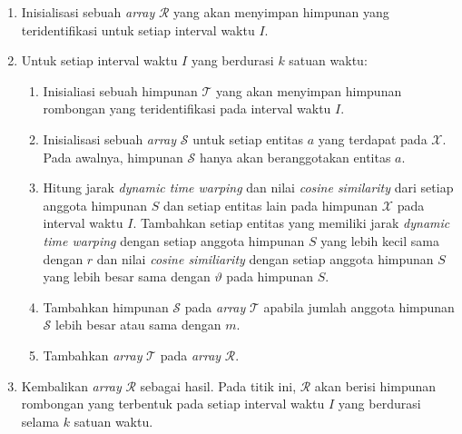 \begin{enumerate}
    \item Inisialisasi sebuah \textit{array} $\mathcal{R}$ yang akan menyimpan himpunan \pergerakankolektif yang teridentifikasi untuk setiap interval waktu $I$.
    \item Untuk setiap interval waktu $I$ yang berdurasi $k$ satuan waktu:
    
    \begin{enumerate}
        \item Inisialiasi sebuah himpunan $\mathcal{T}$ yang akan menyimpan himpunan rombongan yang teridentifikasi pada interval waktu $I$.  
        \item Inisialisasi sebuah \textit{array} $\mathcal{S}$ untuk setiap entitas $a$ yang terdapat pada $\mathcal{X}$. Pada awalnya, himpunan $\mathcal{S}$ hanya akan beranggotakan entitas $a$.
        \item Hitung jarak \textit{dynamic time warping} dan nilai \textit{cosine similarity} dari setiap anggota himpunan $S$ dan setiap entitas lain pada himpunan $\mathcal{X}$ pada interval waktu $I$. Tambahkan setiap entitas yang memiliki jarak \textit{dynamic time warping} dengan setiap anggota himpunan $S$ yang lebih kecil sama dengan $r$ dan nilai \textit{cosine similiarity} dengan setiap anggota himpunan $S$ yang lebih besar sama dengan $\vartheta$ pada himpunan $S$.
        \item Tambahkan himpunan $\mathcal{S}$ pada \textit{array} $\mathcal{T}$ apabila jumlah anggota himpunan $\mathcal{S}$ lebih besar atau sama dengan $m$.
        \item Tambahkan \textit{array} $\mathcal{T}$ pada \textit{array} $\mathcal{R}$.
    \end{enumerate}
    \item Kembalikan \textit{array} $\mathcal{R}$ sebagai hasil. Pada titik ini, $\mathcal{R}$ akan berisi himpunan rombongan yang terbentuk pada setiap interval waktu $I$ yang berdurasi selama $k$ satuan waktu.
\end{enumerate}

\iffalse

Algoritma tersebut memiliki kompleksitas waktu sebesar $O(n^4k^2)$ di mana $n$ merupakan jumlah entitas yang terdapat pada $\mathcal{X}$. Hal tersebut dapat dilihat pada baris 12 dari algoritma identifikasi. Pada titik tersebut, algoritma identifikasi memiliki kompleksitas sebesar $O(n^4)$ dan fungsi $DTWDistance$ memiliki kompleksitas sebesar $O(t^2)$ seperti yang sudah dibahas melalui subbab \ref{sec:dtw}. Sedangkan kompleksitas tempat yang dimiliki oleh algoritma tersebut adalah sebesar $O(n\;i)$ di mana $i$ merupakan jum. Hal tersebut dapat dihitung melalui perkalian antara jumlah interval waktu yang mungkin sebesar

\fi
